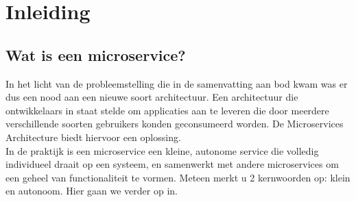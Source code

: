 \chapter{Inleiding}
\label{ch:inleiding}



\section{Wat is een microservice?}
\label{sec:wat-is-een-microservice}
In het licht van de probleemstelling die in de samenvatting aan bod kwam was er dus een nood aan een nieuwe soort architectuur. Een architectuur die ontwikkelaars in staat stelde om applicaties aan te leveren die door meerdere verschillende soorten gebruikers konden geconsumeerd worden. De Microservices Architecture biedt hiervoor een oplossing. 
\\
In de praktijk is een microservice een kleine, autonome service die volledig individueel draait op een systeem, en samenwerkt met andere microservices om een geheel van functionaliteit te vormen. Meteen merkt u 2 kernwoorden op: klein en autonoom. Hier gaan we verder op in.
\\
